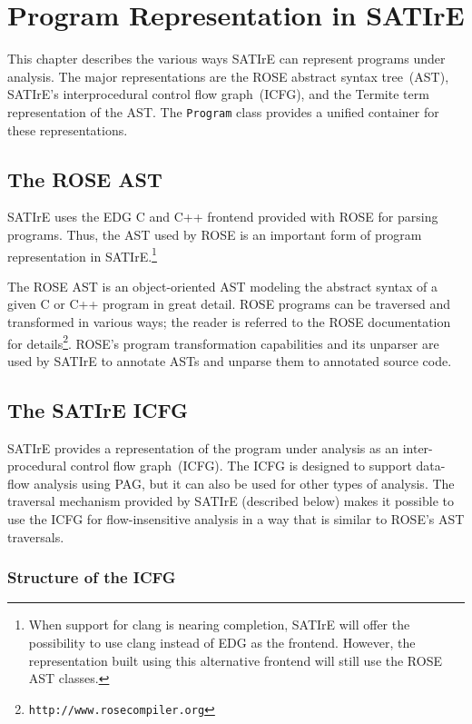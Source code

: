 \documentclass[a4paper,12pt]{report}
\begin{document}
\chapter{Program Representation in SATIrE}
\label{chap:program_representation}

This chapter describes the various ways SATIrE can represent programs under
analysis. The major representations are the ROSE abstract syntax tree~(AST),
SATIrE's interprocedural control flow graph~(ICFG), and the Termite term
representation of the AST. The \texttt{Program} class provides a unified
container for these representations.

\section{The ROSE AST}
\label{sec:rose_ast}

SATIrE uses the EDG C and C++ frontend provided with ROSE for parsing
programs. Thus, the AST used by ROSE is an important form of program
representation in SATIrE.\footnote{When support for clang is nearing
completion, SATIrE will offer the possibility to use clang instead of EDG as
the frontend. However, the representation built using this alternative
frontend will still use the ROSE AST classes.}

The ROSE AST is an object-oriented AST modeling the abstract syntax of a
given C or C++ program in great detail. ROSE programs can be traversed and
transformed in various ways; the reader is referred to the ROSE
documentation for details\footnote{\texttt{http://www.rosecompiler.org}}.
ROSE's program transformation capabilities and its unparser are used by
SATIrE to annotate ASTs and unparse them to annotated source code.

\section{The SATIrE ICFG}
\label{sec:satire_icfg}

SATIrE provides a representation of the program under analysis as an
inter-procedural control flow graph~(ICFG). The ICFG is designed to support
data-flow analysis using PAG, but it can also be used for other types of
analysis. The traversal mechanism provided by SATIrE (described below) makes
it possible to use the ICFG for flow-insensitive analysis in a way that is
similar to ROSE's AST traversals.

\subsection{Structure of the ICFG}
\label{sec:icfg_structure}
\end{document}
